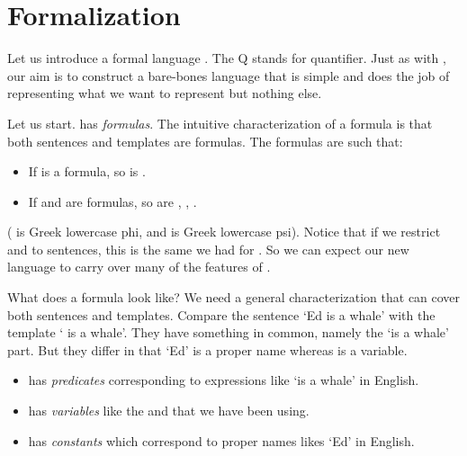 \section{Formalization}

Let us introduce a formal language \lL[Q]{}. The Q stands for quantifier. Just 
as with \lL, our aim is to construct a bare-bones language that is simple and 
does the job of representing what we want to represent but nothing else. 

Let us start. \lL[Q]{} has \emph{formulas}. The intuitive characterization of a 
formula is that  both sentences and templates are formulas. The formulas are 
such that:

\begin{itemize}

 \item If \p{\phi} is a formula, so is \p{\lnot\phi}.

 \item If \p{\phi} and \p{\psi} are formulas, so are \p{(\phi \land \psi)}, 
  \p{(\phi \lor \psi)}, \p{(\phi \limplies \psi)}.

\end{itemize}

(\p{\phi} is Greek lowercase phi, and \p{\psi} is Greek lowercase psi). Notice 
that if we restrict \p{\phi} and \p{\psi} to sentences, this is the same we had 
for \lL.  So we can expect our new language \lL[Q] to carry over many of the 
features of \lL.

What does a formula look like? We need a general characterization that can cover 
both sentences and templates. Compare the sentence `Ed is a whale' with the 
template ` is a whale'. They have something in common, namely the `is a 
whale' part. But they differ in that `Ed' is a proper name whereas  is a 
variable.  

\begin{itemize}
 
 \item \lL[Q] has \emph{predicates} corresponding to expressions like `is a 
  whale' in English.  

\item \lL[Q] has \emph{variables} like the  and  that we have been 
 using.

\item \lL[Q] has \emph{constants} which correspond to proper names likes `Ed' in 
 English. 

 \end{itemize}

